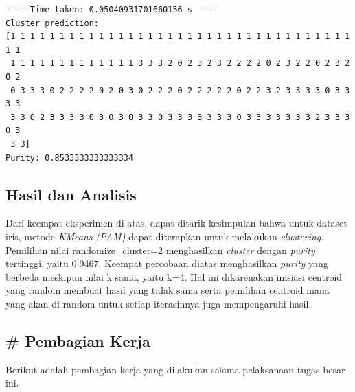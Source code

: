 \documentclass[11pt]{article}
\begin{document}
    \begin{Verbatim}[commandchars=\\\{\}]
---- Time taken: 0.05040931701660156 s ----
Cluster prediction:
[1 1 1 1 1 1 1 1 1 1 1 1 1 1 1 1 1 1 1 1 1 1 1 1 1 1 1 1 1 1 1 1 1 1 1 1 1
 1 1 1 1 1 1 1 1 1 1 1 1 1 3 3 3 2 0 2 3 2 3 2 2 2 2 0 2 3 2 2 0 2 3 2 0 2
 0 3 3 3 0 2 2 2 2 0 2 0 3 0 2 2 2 0 2 2 2 2 2 0 2 2 3 2 3 3 3 3 0 3 3 3 3
 3 3 0 2 3 3 3 3 0 3 0 3 0 3 3 0 3 3 3 3 3 3 3 0 3 3 3 3 3 3 3 2 3 3 3 0 3
 3 3]
Purity: 0.8533333333333334

    \end{Verbatim}

    \subsection{Hasil dan Analisis}\label{hasil-dan-analisis}

Dari keempat eksperimen di atas, dapat ditarik kesimpulan bahwa untuk
dataset iris, metode \emph{KMeans (PAM)} dapat diterapkan untuk
melakukan \emph{clustering}. Pemilihan nilai randomize\_cluster=2
menghasilkan \emph{cluster} dengan \emph{purity} tertinggi, yaitu
0.9467. Keempat percobaan diatas menghasilkan \emph{purity} yang berbeda
meskipun nilai k sama, yaitu k=4. Hal ini dikarenakan inisiasi centroid
yang random membuat hasil yang tidak sama serta pemilihan centroid mana
yang akan di-random untuk setiap iterasinnya juga mempengaruhi hasil.

    \subsection{\# Pembagian Kerja}\label{pembagian-kerja}

Berikut adalah pembagian kerja yang dilakukan selama pelaksanaan tugas
besar ini.
\end{document}
